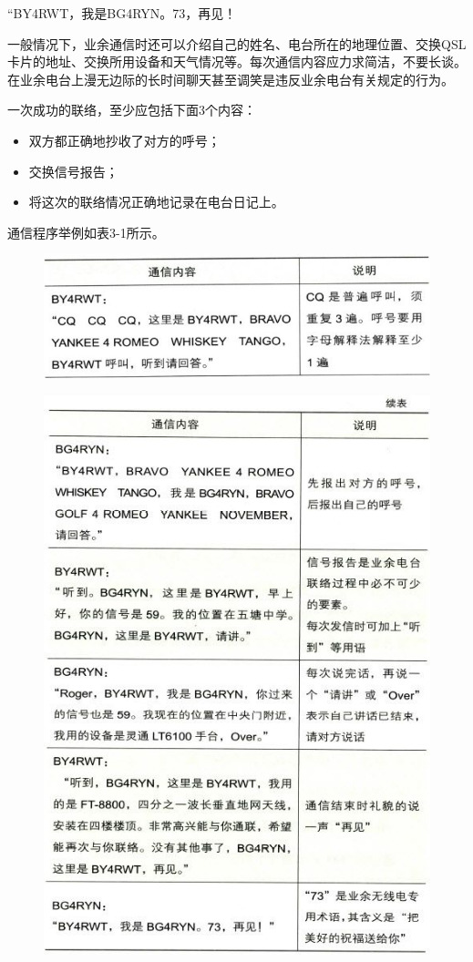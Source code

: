 \documentclass[12pt,UTF8]{ctexbook}
\begin{document}
“BY4RWT，我是BG4RYN。73，再见！

一般情况下，业余通信时还可以介绍自己的姓名、电台所在的地理位置、交换QSL卡片的地址、交换所用设备和天气情况等。每次通信内容应力求简洁，不要长谈。在业余电台上漫无边际的长时间聊天甚至调笑是违反业余电台有关规定的行为。

一次成功的联络，至少应包括下面3个内容：

\begin{itemize}
	\item 双方都正确地抄收了对方的呼号；
	\item 交换信号报告；
	\item 将这次的联络情况正确地记录在电台日记上。
\end{itemize}

通信程序举例如表3-1所示。

\begin{figure}[htbp]
	\centering
	\includegraphics[width=0.7\linewidth]{29}
	\caption{}
	\label{fig:1}
\end{figure}

\begin{figure}[htbp]
	\centering
	\includegraphics[width=0.7\linewidth]{30}
	\caption{}
	\label{fig:1}
\end{figure}
\end{document}
